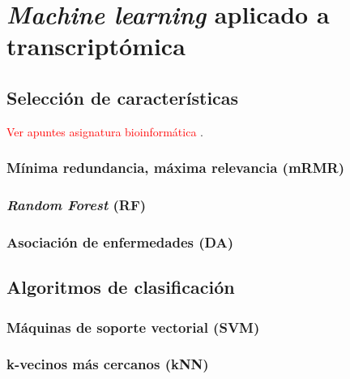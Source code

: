 \chapter{\textit{Machine learning} aplicado a transcriptómica}

\section{Selección de características}

\textcolor{red}{Ver apuntes asignatura bioinformática} \cite{HerreraMaldonado2020}.

\subsection{Mínima redundancia, máxima relevancia (mRMR)}

\subsection{\textit{Random Forest} (RF)}

\subsection{Asociación de enfermedades (DA)}

\section{Algoritmos de clasificación}

\subsection{Máquinas de soporte vectorial (SVM)}

\subsection{k-vecinos más cercanos (kNN)}


